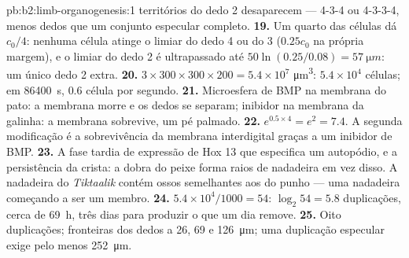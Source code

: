\begin{solution}{pb:b2:limb-organogenesis:1}
territórios do dedo 2 desaparecem --- 4-3-4 ou 4-3-3-4, menos dedos
que um conjunto especular completo.
\textbf{19.} Um quarto das células dá $c_0/4$: nenhuma célula atinge o
limiar do dedo 4 ou do 3 ($0.25 c_0$ na própria margem), e o limiar do
dedo 2 é ultrapassado até $50\ln(0.25/0.08) =
\qty{57}{\micro m}$: um único dedo 2 extra.
\textbf{20.} $3\times 300\times 300\times 200 = 5.4\times 10^{7}$
\unit{\micro m^3}: $5.4\times 10^{4}$ células; em \qty{86400}{s},
$0.6$ célula por segundo.
\textbf{21.} Microesfera de BMP na membrana do pato: a membrana morre e
os dedos se separam; inibidor na membrana da galinha: a membrana
sobrevive, um pé palmado.
\textbf{22.} $e^{0.5\times 4} = e^{2} = 7.4$. A segunda modificação é a
sobrevivência da membrana interdigital graças a um inibidor de BMP.
\textbf{23.} A fase tardia de expressão de Hox 13 que especifica um
autopódio, e a persistência da crista: a dobra do peixe forma raios de
nadadeira em vez disso. A nadadeira do \emph{Tiktaalik} contém ossos
semelhantes aos do punho --- uma nadadeira começando a ser um membro.
\textbf{24.} $5.4\times 10^{4}/1000 = 54$: $\log_2 54 = 5.8$
duplicações, cerca de \qty{69}{h}, três dias para produzir o que um dia
remove.
\textbf{25.} Oito duplicações; fronteiras dos dedos a 26, 69 e
\qty{126}{\micro m}; uma duplicação especular exige pelo menos
\qty{252}{\micro m}.
\end{solution}

